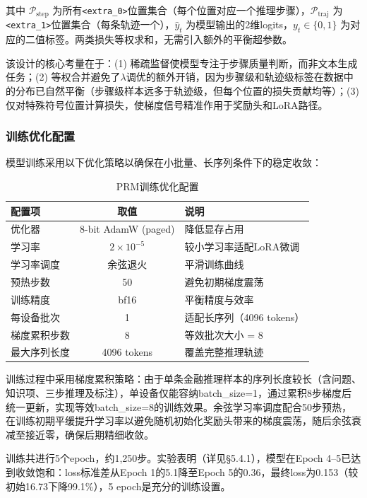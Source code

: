 \documentclass[professional,privacy,print,win,long,STEM,AutoFakeBold]{def/buaa}
\begin{document}
其中 $\mathcal{P}_{\text{step}}$ 为所有\texttt{<extra\_0>}位置集合（每个位置对应一个推理步骤），$\mathcal{P}_{\text{traj}}$ 为\texttt{<extra\_1>}位置集合（每条轨迹一个），$\hat{y}_t$ 为模型输出的2维logits，$y_t \in \{0, 1\}$ 为对应的二值标签。两类损失等权求和，无需引入额外的平衡超参数。

该设计的核心考量在于：(1) 稀疏监督使模型专注于步骤质量判断，而非文本生成任务；(2) 等权合并避免了$\lambda$调优的额外开销，因为步骤级和轨迹级标签在数据中的分布已自然平衡（步骤级样本远多于轨迹级，但每个位置的损失贡献均等）；(3) 仅对特殊符号位置计算损失，使梯度信号精准作用于奖励头和LoRA路径。

\subsubsection{训练优化配置}

模型训练采用以下优化策略以确保在小批量、长序列条件下的稳定收敛：

\begin{table}[h]
\centering
\caption{PRM训练优化配置}
\label{tab:prm-opt}
\begin{tabular}{lcl}
\toprule
配置项 & 取值 & 说明 \\
\midrule
优化器 & 8-bit AdamW (paged) & 降低显存占用 \\
学习率 & $2\times10^{-5}$ & 较小学习率适配LoRA微调 \\
学习率调度 & 余弦退火 & 平滑训练曲线 \\
预热步数 & 50 & 避免初期梯度震荡 \\
训练精度 & bf16 & 平衡精度与效率 \\
每设备批次 & 1 & 适配长序列（4096 tokens） \\
梯度累积步数 & 8 & 等效批次大小 = 8 \\
最大序列长度 & 4096 tokens & 覆盖完整推理轨迹 \\
\bottomrule
\end{tabular}
\end{table}

训练过程中采用梯度累积策略：由于单条金融推理样本的序列长度较长（含问题、知识项、三步推理及标注），单设备仅能容纳batch\_size=1，通过累积8步梯度后统一更新，实现等效batch\_size=8的训练效果。余弦学习率调度配合50步预热，在训练初期平缓提升学习率以避免随机初始化奖励头带来的梯度震荡，随后余弦衰减至接近零，确保后期精细收敛。

训练共进行5个epoch，约1,250步。实验表明（详见§5.4.1），模型在Epoch 4--5已达到收敛饱和：loss标准差从Epoch 1的5.1降至Epoch 5的0.36，最终loss为0.153（较初始16.73下降99.1\%），5 epoch是充分的训练设置。
\end{document}
